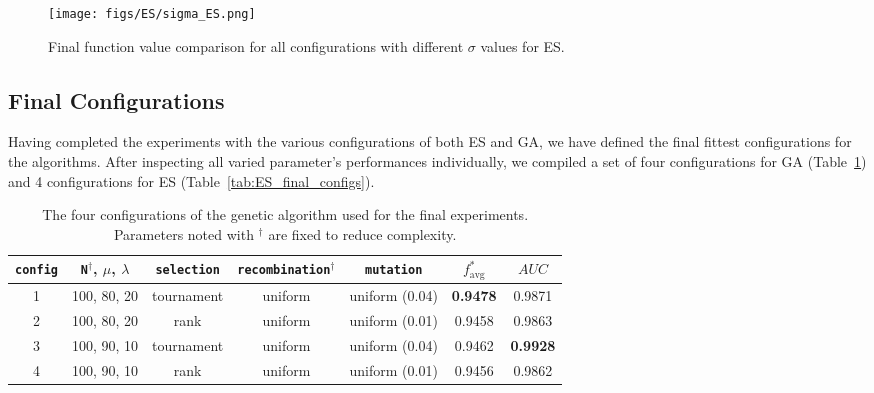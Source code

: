\documentclass{article}
\begin{document}
\vspace{5cm}

\begin{figure*}[htbp]
    \centering
    \texttt{[image: figs/ES/sigma\_ES.png]}
    \captionsetup{width=.55\textwidth}
    \caption{
        Final function value comparison for all configurations with different $\sigma$ values for ES.
    }
    \label{fig:sigma_ES}
\end{figure*}

\newpage

\subsection*{Final Configurations}
\label{subsec:final_configs}

Having completed the experiments with the various configurations of both ES and GA, we have defined the final fittest configurations for the algorithms.
After inspecting all varied parameter's performances individually, we compiled a set of four configurations for GA (Table~\ref{tab:GA_final_configs}) and 4 configurations for ES (Table~\ref{tab:ES_final_configs}).

\begin{table}[htbp]
    \centering
    \begin{tabular}{c|cccc|cc}
        \toprule
        \texttt{config} &
        \texttt{N}$^\dagger$, $\mu$, $\lambda$ & \texttt{selection} & \texttt{recombination}$^\dagger$ & \texttt{mutation}
            & $f^*_{\mathrm{avg}} $ & $AUC$ \\ %
        \midrule
        1 & 100, 80, 20  &  tournament  &  uniform   &  uniform (0.04)  &  \textbf{0.9478}  &   0.9871           \\
        2 & 100, 80, 20  &  rank        &  uniform   &  uniform (0.01)  &  0.9458           &   0.9863           \\
        3 & 100, 90, 10  &  tournament  &  uniform   &  uniform (0.04)  &  0.9462           &   \textbf{0.9928}  \\
        4 & 100, 90, 10  &  rank        &  uniform   &  uniform (0.01)  &  0.9456           &   0.9862           \\
        \bottomrule
    \end{tabular}
    \vspace{0.1cm}
    \captionsetup{width=.75\textwidth, justification=centering}
    \caption{
        The four configurations of the genetic algorithm used for the final experiments.
        Parameters noted with $^\dagger$ are fixed to reduce complexity.
    }
    \label{tab:GA_final_configs}
\end{table}
\end{document}
